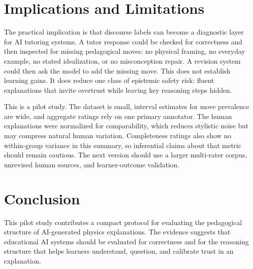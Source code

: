 \documentclass{article}
\begin{document}
\section{Implications and Limitations}
The practical implication is that discourse labels can become a diagnostic layer for AI tutoring systems. A tutor response could be checked for correctness and then inspected for missing pedagogical moves: no physical framing, no everyday example, no stated idealization, or no misconception repair. A revision system could then ask the model to add the missing move. This does not establish learning gains. It does reduce one class of epistemic safety risk: fluent explanations that invite overtrust while leaving key reasoning steps hidden.

This is a pilot study. The dataset is small, interval estimates for move prevalence are wide, and aggregate ratings rely on one primary annotator. The human explanations were normalized for comparability, which reduces stylistic noise but may compress natural human variation. Completeness ratings also show no within-group variance in this summary, so inferential claims about that metric should remain cautious. The next version should use a larger multi-rater corpus, unrevised human sources, and learner-outcome validation.

\section{Conclusion}
This pilot study contributes a compact protocol for evaluating the pedagogical structure of AI-generated physics explanations. The evidence suggests that educational AI systems should be evaluated for correctness and for the reasoning structure that helps learners understand, question, and calibrate trust in an explanation.



\end{document}
